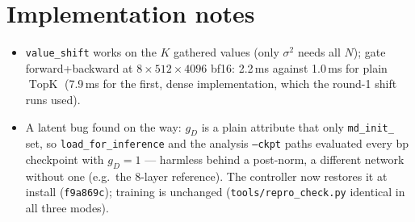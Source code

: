\documentclass[11pt,a4paper]{article}
\newcommand{\code}[1]{\texttt{#1}}
\newcommand{\topk}{\operatorname{TopK}}
\begin{document}
\section{Implementation notes}

\begin{itemize}[leftmargin=1.2em]
\item \code{value\_shift} works on the \(K\) gathered values (only
  \(\sigma^2\) needs all \(N\)); gate forward+backward at \(8\times512\times4096\)
  bf16: 2.2\,ms against 1.0\,ms for plain \(\topk\) (7.9\,ms for the first,
  dense implementation, which the round-1 shift runs used).
\item A latent bug found on the way: \(g_D\) is a plain attribute that only
  \code{md\_init\_} set, so \code{load\_for\_inference} and the analysis
  \code{--ckpt} paths evaluated every bp checkpoint with \(g_D=1\) --- harmless
  behind a post-norm, a different network without one (e.g.\ the 8-layer
  reference).  The controller now restores it at install
  (\code{f9a869c}); training is unchanged (\code{tools/repro\_check.py}
  identical in all three modes).
\end{itemize}
\end{document}
